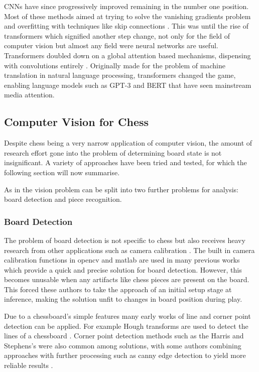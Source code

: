 CNNs have since progressively improved remaining in the number one position.  Most of these methods aimed at trying to solve the vanishing gradients problem \cite{hochreiter1998vanishing}
and overfitting with techniques like skip connections \cite{he2016deep}.
This was until the rise of transformers which signified another step change, not only for the field of computer vision but almost any field
were neural networks are useful.
Transformers doubled down on a global attention based mechanisms, dispensing with convolutions entirely \cite{vaswani2017attention}.
Originally made for the problem of machine translation in natural language processing, transformers changed the game, enabling language models such as GPT-3 \cite{radford2019language}
and BERT \cite{devlin2018bert} that have seen mainstream media attention.

\subsection{Computer Vision for Chess}
Despite chess being a very narrow application of computer vision, the amount of research effort gone into the problem of determining
board state is not insignificant.
A variety of approaches have been tried and tested, for which the following section will now summarise.

As in \cite{Ding2016ChessVisionC} the vision problem can be split into two further problems for analysis: board detection and piece recognition.

\subsubsection{Board Detection}
The problem of board detection is not specific to chess but also receives heavy research from other applications such as camera calibration \cite{cameraCalibration}.
The built in camera calibration functions in opencv \cite{opencv_library} and matlab \cite{MATLAB:2010} are used in many previous works \cite{Koray2016ACV, bowers_2014} which
provide a quick and precise solution for board detection.  However, this becomes unusable when any artifacts like chess pieces are present on the board.
This forced these authors to take the approach of an initial setup stage at inference, making the solution unfit to changes in board position during play.

Due to a chessboard's simple features many early works of line and corner point detection can be applied.  For example Hough
transforms are used to detect the lines of a chessboard \cite{CVChess, nusChessVision}.  Corner point detection methods such as the
Harris and Stephens's \cite{harris1988combined} were also common among solutions, with some authors combining approaches with further
processing such as canny edge detection to yield more reliable results \cite{irobot, CVChess, nusChessVision}.

